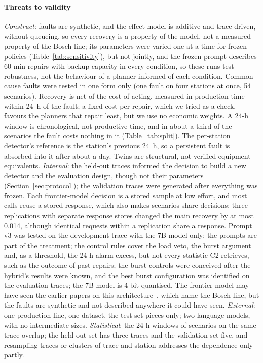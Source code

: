 \documentclass[preprint,11pt]{elsarticle}
\begin{document}
\paragraph{Threats to validity}
\emph{Construct}: faults are synthetic, and the effect model is additive and trace-driven, without queueing, so every recovery is a property of the model, not a measured property of the Bosch line; its parameters were varied one at a time for frozen policies (Table~\ref{tab:sensitivity}), but not jointly, and the frozen prompt describes 60-min repairs with backup capacity in every condition, so these runs test robustness, not the behaviour of a planner informed of each condition. Common-cause faults were tested in one form only (one fault on four stations at once, 54 scenarios). Recovery is net of the cost of acting, measured in production time within 24~h of the fault; a fixed cost per repair, which we tried as a check, favours the planners that repair least, but we use no economic weights. A 24-h window is chronological, not productive time, and in about a third of the scenarios the fault costs nothing in it (Table~\ref{tab:split}). The per-station detector's reference is the station's previous 24~h, so a persistent fault is absorbed into it after about a day. Twins are structural, not verified equipment equivalents. \emph{Internal}: the held-out traces informed the decision to build a new detector and the evaluation design, though not their parameters (Section~\ref{sec:protocol}); the validation traces were generated after everything was frozen. Each frontier-model decision is a stored sample at low effort, and most calls reuse a stored response, which also makes scenarios share decisions; three replications with separate response stores changed the main recovery by at most 0.014, although identical requests within a replication share a response. Prompt v3 was tested on the development trace with the 7B model only; the prompts are part of the treatment; the control rules cover the load veto, the burst argument and, as a threshold, the 24-h alarm excess, but not every statistic C2 retrieves, such as the outcome of past repairs; the burst controls were conceived after the hybrid's results were known, and the best burst configuration was identified on the evaluation traces; the 7B model is 4-bit quantised. The frontier model may have seen the earlier papers on this architecture~\cite{sanchez2020selfstar,sanchez2020jii}, which name the Bosch line, but the faults are synthetic and not described anywhere it could have seen. \emph{External}: one production line, one dataset, the test-set pieces only; two language models, with no intermediate sizes. \emph{Statistical}: the 24-h windows of scenarios on the same trace overlap; the held-out set has three traces and the validation set five, and resampling traces or clusters of trace and station addresses the dependence only partly.
\end{document}
